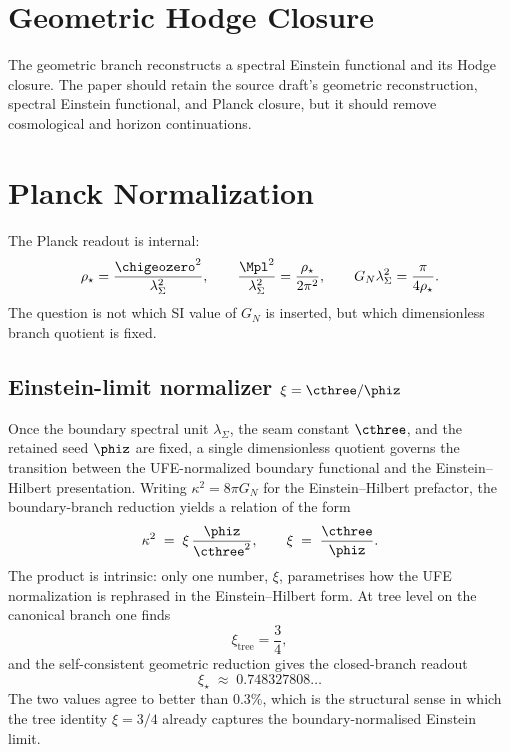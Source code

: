 \section{Geometric Hodge Closure}

The geometric branch reconstructs a spectral Einstein functional and its Hodge closure. The paper
should retain the source draft's geometric reconstruction, spectral Einstein functional, and Planck
closure, but it should remove cosmological and horizon continuations.

\section{Planck Normalization}

The Planck readout is internal:
\[
\rho_\star=\frac{\chigeozero^2}{\lambda_\Sigma^2},
\qquad
\frac{\Mpl^2}{\lambda_\Sigma^2}=\frac{\rho_\star}{2\pi^2},
\qquad
G_N\lambda_\Sigma^2=\frac{\pi}{4\rho_\star}.
\]
The question is not which SI value of $G_N$ is inserted, but which dimensionless branch quotient is
fixed.

\subsection{Einstein-limit normalizer \texorpdfstring{$\xi=\cthree/\phiz$}{xi = c3/phi0}}
\label{ssec:einstein-limit-normalizer}

Once the boundary spectral unit $\lambda_\Sigma$, the seam constant $\cthree$, and the retained
seed $\phiz$ are fixed, a single dimensionless quotient governs the transition between the
UFE-normalized boundary functional and the Einstein--Hilbert presentation. Writing
$\kappa^2=8\pi G_N$ for the Einstein--Hilbert prefactor, the boundary-branch reduction yields a
relation of the form
\begin{equation}
\label{eq:kappa-xi}
\kappa^2 \;=\; \xi\,\frac{\phiz}{\cthree^2},
\qquad
\xi \;=\; \frac{\cthree}{\phiz}.
\end{equation}
The product is intrinsic: only one number, $\xi$, parametrises how the UFE normalization is
rephrased in the Einstein--Hilbert form. At tree level on the canonical branch one finds
\[
\xi_{\mathrm{tree}}=\frac{3}{4},
\]
and the self-consistent geometric reduction gives the closed-branch readout
\[
\xi_\star \;\approx\; 0.748327808\ldots
\]
The two values agree to better than $0.3\%$, which is the structural sense in which the tree
identity $\xi=3/4$ already captures the boundary-normalised Einstein limit.

